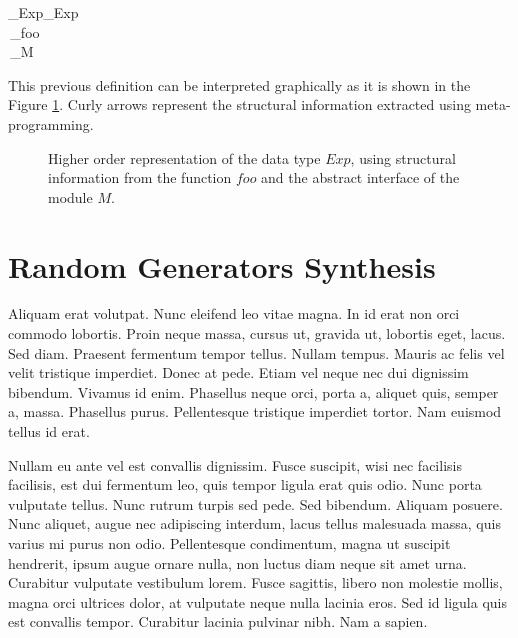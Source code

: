 \documentclass[conference]{IEEEtran}
\newcommand{\Conid}[1]{\mathit{#1}}
\newcommand{\Varid}[1]{\mathit{#1}}
\def\resethooks{%
  \global\let\SaveRestoreHook\empty
  \global\let\ColumnHook\empty}
\let\hspre\empty
\let\hspost\empty
\begin{document}
\begin{hscode}\SaveRestoreHook
\column{B}{@{}>{\hspre}l<{\hspost}@{}}%
\column{16}{@{}>{\hspre}l<{\hspost}@{}}%
\column{24}{@{}>{\hspre}l<{\hspost}@{}}%
\column{34}{@{}>{\hspre}l<{\hspost}@{}}%
\column{E}{@{}>{\hspre}l<{\hspost}@{}}%
\>[B]{}\;_{Exp}{}\<[16]%
\>[16]{}\mathrel{=}{}\<[24]%
\>[24]{}_{Exp}\;{}\<[34]%
\>[34]{}\otimes\;\<[E]%
\\
\>[16]{}\,\oplus\;{}\<[24]%
\>[24]{}_{foo}\;{}\<[34]%
\>[34]{}\otimes\;\<[E]%
\\
\>[16]{}\,\oplus\;{}\<[24]%
\>[24]{}_{M}{}\<[E]%
\ColumnHook
\end{hscode}\resethooks

This previous definition can be interpreted graphically as it is shown in the
Figure \ref{fig:hrep}.
%
Curly arrows represent the structural information extracted using
meta-programming.

\begin{figure}[t]
  \centering
  
  \caption{Higher order representation of the data type \ensuremath{\Conid{Exp}}, using structural
    information from the function \ensuremath{\Varid{foo}} and the abstract interface of the module
    \ensuremath{\Conid{M}}.}
  \label{fig:hrep}
\end{figure}


\section{Random Generators Synthesis} \label{sec:synthesis}

Aliquam erat volutpat. Nunc eleifend leo vitae magna. In id erat non orci
commodo lobortis. Proin neque massa, cursus ut, gravida ut, lobortis eget,
lacus. Sed diam. Praesent fermentum tempor tellus. Nullam tempus. Mauris ac
felis vel velit tristique imperdiet. Donec at pede. Etiam vel neque nec dui
dignissim bibendum. Vivamus id enim. Phasellus neque orci, porta a, aliquet
quis, semper a, massa. Phasellus purus. Pellentesque tristique imperdiet tortor.
Nam euismod tellus id erat.

Nullam eu ante vel est convallis dignissim. Fusce suscipit, wisi nec facilisis
facilisis, est dui fermentum leo, quis tempor ligula erat quis odio. Nunc porta
vulputate tellus. Nunc rutrum turpis sed pede. Sed bibendum. Aliquam posuere.
Nunc aliquet, augue nec adipiscing interdum, lacus tellus malesuada massa, quis
varius mi purus non odio. Pellentesque condimentum, magna ut suscipit hendrerit,
ipsum augue ornare nulla, non luctus diam neque sit amet urna. Curabitur
vulputate vestibulum lorem. Fusce sagittis, libero non molestie mollis, magna
orci ultrices dolor, at vulputate neque nulla lacinia eros. Sed id ligula quis
est convallis tempor. Curabitur lacinia pulvinar nibh. Nam a sapien.
\end{document}
